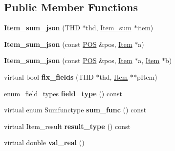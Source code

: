 \subsection*{Public Member Functions}
\begin{DoxyCompactItemize}
\item 
\mbox{\label{classItem__sum__json_ad39778313443b5f72cc20ba4de08ed4b}} 
{\bfseries Item\+\_\+sum\+\_\+json} (T\+HD $\ast$thd, \mbox{\hyperlink{classItem__sum}{Item\+\_\+sum}} $\ast$item)
\item 
\mbox{\label{classItem__sum__json_af7a4e5b4b9e40483b3e6c199f170eda9}} 
{\bfseries Item\+\_\+sum\+\_\+json} (const \mbox{\hyperlink{structYYLTYPE}{P\+OS}} \&pos, \mbox{\hyperlink{classItem}{Item}} $\ast$a)
\item 
\mbox{\label{classItem__sum__json_a55cd05c449c5b599c692a1f65d8c422b}} 
{\bfseries Item\+\_\+sum\+\_\+json} (const \mbox{\hyperlink{structYYLTYPE}{P\+OS}} \&pos, \mbox{\hyperlink{classItem}{Item}} $\ast$a, \mbox{\hyperlink{classItem}{Item}} $\ast$b)
\item 
\mbox{\label{classItem__sum__json_ad4b37b12c1a34905b41c73807e2df04a}} 
virtual bool {\bfseries fix\+\_\+fields} (T\+HD $\ast$thd, \mbox{\hyperlink{classItem}{Item}} $\ast$$\ast$p\+Item)
\item 
\mbox{\label{classItem__sum__json_a55b8edf0e660b3757f57c7829cd4f10b}} 
enum\+\_\+field\+\_\+types {\bfseries field\+\_\+type} () const
\item 
\mbox{\label{classItem__sum__json_a87202670697052b5b9b160d1c1fecee9}} 
virtual enum Sumfunctype {\bfseries sum\+\_\+func} () const
\item 
\mbox{\label{classItem__sum__json_af70980b7520299c5b761458ad549b593}} 
virtual Item\+\_\+result {\bfseries result\+\_\+type} () const
\item 
\mbox{\label{classItem__sum__json_ac6208337d4b731a2e9b725ce14291ac3}} 
virtual double {\bfseries val\+\_\+real} ()
\item 
\mbox{\label{classItem__sum__json_a7d77263416efdd27c5d6eca91f6b7222}} 
$$
\end{DoxyCompactItemize}
